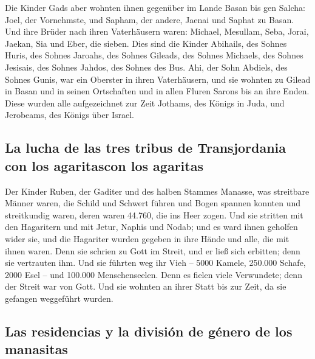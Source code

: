  Die Kinder Gads aber wohnten ihnen gegenüber im Lande
Basan bis gen Salcha:  Joel, der Vornehmste, und Sapham,
der andere, Jaenai und Saphat zu Basan.  Und ihre Brüder
nach ihren Vaterhäusern waren: Michael, Mesullam, Seba, Jorai, Jaekan,
Sia und Eber, die sieben.  Dies sind die Kinder Abihails,
des Sohnes Huris, des Sohnes Jaroahs, des Sohnes Gileads, des Sohnes
Michaels, des Sohnes Jesisais, des Sohnes Jahdos, des Sohnes des Bus.
 Ahi, der Sohn Abdiels, des Sohnes Gunis, war ein
Oberster in ihren Vaterhäusern,  und sie wohnten zu
Gilead in Basan und in seinen Ortschaften und in allen Fluren Sarons bis
an ihre Enden.  Diese wurden alle aufgezeichnet zur Zeit
Jothams, des Königs in Juda, und Jerobeams, des Königs über Israel.

\hypertarget{la-lucha-de-las-tres-tribus-de-transjordania-con-los-agaritascon-los-agaritas}{%
\subsection{La lucha de las tres tribus de Transjordania con los
agaritascon los
agaritas}\label{la-lucha-de-las-tres-tribus-de-transjordania-con-los-agaritascon-los-agaritas}}

 Der Kinder Ruben, der Gaditer und des halben Stammes
Manasse, was streitbare Männer waren, die Schild und Schwert führen und
Bogen spannen konnten und streitkundig waren, deren waren 44.760, die
ins Heer zogen.  Und sie stritten mit den Hagaritern und
mit Jetur, Naphis und Nodab;  und es ward ihnen geholfen
wider sie, und die Hagariter wurden gegeben in ihre Hände und alle, die
mit ihnen waren. Denn sie schrien zu Gott im Streit, und er ließ sich
erbitten; denn sie vertrauten ihm.  Und sie führten weg
ihr Vieh -- 5000 Kamele, 250.000 Schafe, 2000 Esel -- und 100.000
Menschenseelen.  Denn es fielen viele Verwundete; denn
der Streit war von Gott. Und sie wohnten an ihrer Statt bis zur Zeit, da
sie gefangen weggeführt wurden.

\hypertarget{las-residencias-y-la-divisiuxf3n-de-guxe9nero-de-los-manasitas}{%
\subsection{Las residencias y la división de género de los
manasitas}\label{las-residencias-y-la-divisiuxf3n-de-guxe9nero-de-los-manasitas}}

